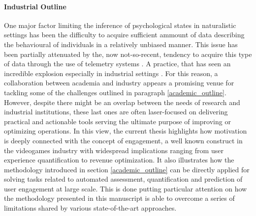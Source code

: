 \paragraph*{Industrial Outline}
\label{industrial_outline}
One major factor limiting the inference of psychological states in naturalistic settings has been the difficulty to acquire sufficient ammount of data describing the behavioural of individuals in a relatively unbiased manner. This issue has been partially attenuated by the, now not-so-recent, tendency to acquire this type of data through the use of telemetry systems \cite{el2016game, drachen2015behavioral}. A practice, that has seen an incredible explosion especially in industrial settings \cite{el2016game, drachen2015behavioral,EUdataregulations2018}. For this reason, a collaboration between academia and industry appears a promising venue for tackling some of the challenges outlined in paragraph \ref{academic_outline}. However, despite there might be an overlap between the needs of research and industrial institutions, these last ones are often laser-focused on delivering practical and actionable tools serving the ultimate purpose of improving or optimizing operations. In this view, the current thesis highlights how motivation is deeply connected with the concept of engagement, a well known construct in the videogames industry with widespread implications ranging from user experience quantification to revenue optimization. It also illustrates how the methodology introduced in section \ref{academic_outline} can be directly applied for solving tasks related to automated assessment, quantification and prediction of user engagement at large scale. This is done putting particular attention on how the methodology presented in this manuscript is able to overcome a series of limitations shared by various state-of-the-art approaches. 
